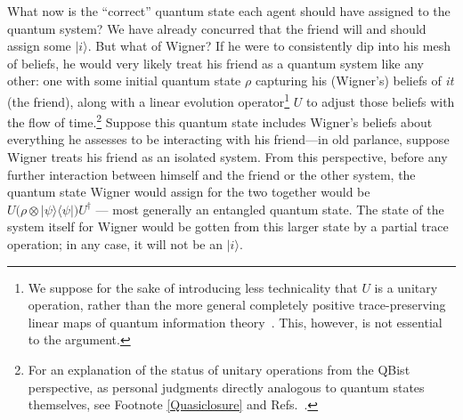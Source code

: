 What now is the ``correct'' quantum state each agent should have assigned to the quantum system?  We have already concurred that the friend will and
should assign some $|i\rangle$.  But what of Wigner?  If he were to consistently dip into his mesh of beliefs, he would very likely treat his friend as a quantum system like any other:  one with some initial quantum state $\rho$ capturing his (Wigner's) beliefs of {\it it\/} (the friend), along with a linear evolution operator\footnote{We suppose for the sake of introducing less technicality that $U$ is a unitary operation, rather than the more general completely positive trace-preserving linear maps of quantum information theory~\cite{Nielsen00}.  This, however, is not essential to the argument.} $U$ to adjust those beliefs with the flow of time.\footnote{For an explanation of the status of unitary operations from the QBist perspective, as personal judgments directly analogous to quantum states themselves, see Footnote \ref{Quasiclosure} and Refs.~\cite{Fuchs02,Fuchs09a,Leifer06}.}  Suppose this quantum state includes Wigner's beliefs about everything he assesses to be interacting with his friend---in old parlance, suppose Wigner treats his friend as an isolated system.%
From this perspective, before any further interaction between himself and the friend or the other system, the quantum state Wigner would assign for the two together would be $U\big(\rho\otimes|\psi\rangle\langle\psi|\big)U^\dagger$ --- most generally an entangled quantum state.  The state of the system itself for Wigner would be gotten from this larger state by a partial trace operation; in any case, it will not be an $|i\rangle$.

